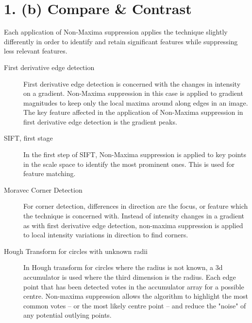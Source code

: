 \documentclass[a4paper,12pt]{article}
\begin{document}
\section{1. (b) Compare \& Contrast}
Each application of Non-Maxima suppression applies the technique slightly differently in order to identify and retain significant features while suppressing less relevant features.
\begin{description}
    \item[First derivative edge detection] First derivative edge detection is concerned with the changes in intensity on a gradient. Non-Maxima suppression in this case is applied to gradient magnitudes to keep only the local maxima around along edges in an image. The key feature affected in the application of Non-Maxima suppression in first derivative edge detection is the gradient peaks.
    \item[SIFT, first stage] In the first step of SIFT, Non-Maxima suppression is applied to key points in the scale space to identify the most prominent ones. This is used for feature matching. 
    \item[Moravec Corner Detection] For corner detection, differences in direction are the focus, or feature which the technique is concerned with. Instead of intensity changes in a gradient as with first derivative edge detection, non-maxima suppression is applied to local intensity variations in direction to find corners.
    \item[Hough Transform for circles with unknown radii] In Hough transform for circles where the radius is not known, a 3d accumulator is used where the third dimension is the radius. Each edge point that has been detected votes in the accumulator array for a possible centre. Non-maxima suppression allows the algorithm to highlight the most common votes -- or the most likely centre point -- and reduce the "noise" of any potential outlying points.
\end{description}
\end{document}
